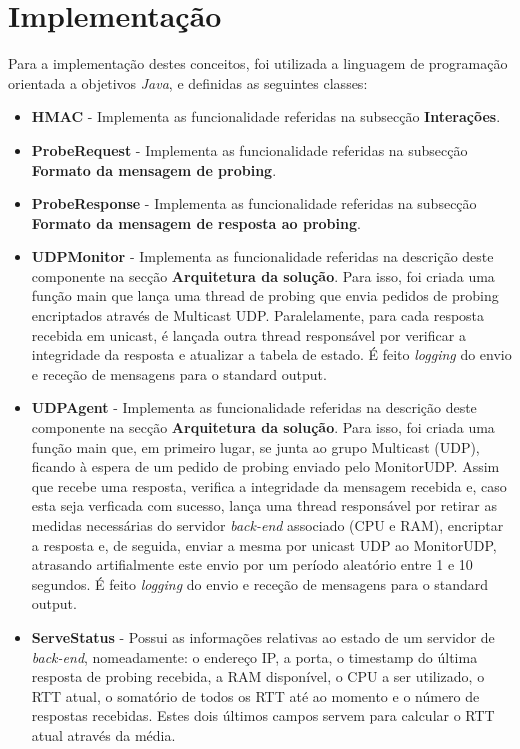 \documentclass{article}
\begin{document}
\section{Implementação}

Para a implementação destes conceitos, foi utilizada a linguagem de programação orientada a objetivos \emph{Java}, e definidas as seguintes classes:

\begin{itemize}
    \item \textbf{HMAC} - Implementa as funcionalidade referidas na subsecção \textbf{Interações}.
    \item \textbf{ProbeRequest} - Implementa as funcionalidade referidas na subsecção \textbf{Formato da mensagem de probing}.
    \item \textbf{ProbeResponse} - Implementa as funcionalidade referidas na subsecção \textbf{Formato da mensagem de resposta ao probing}.
    \item \textbf{UDPMonitor} - Implementa as funcionalidade referidas na descrição deste componente na secção \textbf{Arquitetura da solução}. Para isso, foi criada uma função main que lança uma thread de probing que envia pedidos de probing encriptados através de Multicast UDP. Paralelamente, para cada resposta recebida em unicast, é lançada outra thread responsável por verificar a integridade da resposta e atualizar a tabela de estado. É feito \emph{logging} do envio e receção de mensagens para o standard output.
    \item \textbf{UDPAgent} - Implementa as funcionalidade referidas na descrição deste componente na secção \textbf{Arquitetura da solução}. Para isso, foi criada uma função main que, em primeiro lugar, se junta ao grupo Multicast (UDP), ficando à espera de um pedido de probing enviado pelo MonitorUDP. Assim que recebe uma resposta, verifica a integridade da mensagem recebida e, caso esta seja verficada com sucesso, lança uma thread responsável por retirar as medidas necessárias do servidor \emph{back-end} associado (CPU e RAM), encriptar a resposta e, de seguida, enviar a mesma por unicast UDP ao MonitorUDP, atrasando artifialmente este envio por um período aleatório entre 1 e 10 segundos. É feito \emph{logging} do envio e receção de mensagens para o standard output.
    \item \textbf{ServeStatus} - Possui as informações relativas ao estado de um servidor de \emph{back-end}, nomeadamente: o endereço IP, a porta, o timestamp do última resposta de probing recebida, a RAM disponível, o CPU a ser utilizado, o RTT atual, o somatório de todos os RTT até ao momento e o número de respostas recebidas. Estes dois últimos campos servem para calcular o RTT atual através da média.

\end{itemize}
\end{document}
